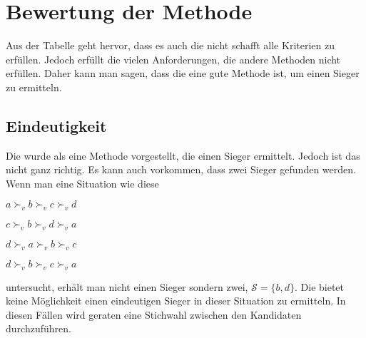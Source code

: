 \section{Bewertung der Methode}
\label{sec:Bewertung1}









Aus der Tabelle geht hervor, dass es auch die \schulze nicht schafft alle Kriterien zu erfüllen. Jedoch erfüllt die \schulze vielen Anforderungen, die andere Methoden nicht erfüllen. Daher kann man sagen, dass die \schulze eine gute \condorcet Methode ist, um einen Sieger zu ermitteln.
\newpage

\subsection{Eindeutigkeit}
\label{sec:eindeutigkeit}
Die \schulze wurde als eine Methode vorgestellt, die einen Sieger ermittelt. Jedoch ist das nicht ganz richtig. Es kann auch vorkommen, dass zwei Sieger gefunden werden. Wenn man eine Situation wie diese

\begin{description}
\centering
\item[3 mal] $a \succ_{v} b \succ_{v} c \succ_{v}d$
\item[2 mal] $c \succ_{v} b \succ_{v} d \succ_{v}a$
\item[2 mal] $d \succ_{v} a \succ_{v} b \succ_{v}c$
\item[2 mal] $d \succ_{v} b \succ_{v} c \succ_{v}a$
\end{description} 
untersucht, erhält man nicht einen Sieger sondern zwei, $\mathcal{S}=\{b,d\}$. Die \schulze bietet keine Möglichkeit einen eindeutigen Sieger in dieser Situation zu ermitteln. In diesen Fällen wird geraten eine Stichwahl zwischen den Kandidaten durchzuführen.
